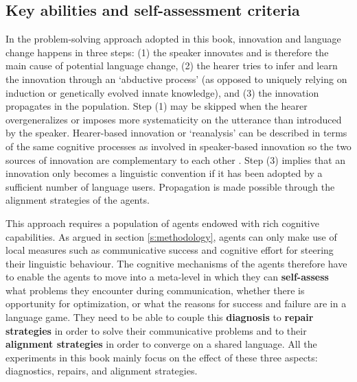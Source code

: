\subsection{Key abilities and self-assessment criteria}

In the problem-solving approach adopted in this book, innovation and language change happens in three steps: (1) the speaker innovates and is therefore the main cause of potential language change, (2) the hearer tries to infer and learn the innovation through an `abductive process' (as opposed to uniquely relying on induction or genetically evolved innate knowledge), and (3) the innovation propagates in the population. Step (1) may be skipped when the hearer overgeneralizes or imposes more systematicity on the utterance than introduced by the speaker. Hearer-based innovation or `reanalysis' can be described in terms of the same cognitive processes as involved in speaker-based innovation so the two sources of innovation are complementary to each other \citep{hoefler08reanalysis}. Step (3) implies that an innovation only becomes a linguistic convention if it has been adopted by a sufficient number of language users. Propagation is made possible through the alignment strategies of the agents.

This approach requires a population of agents endowed with rich cognitive capabilities. As argued in section \ref{s:methodology}, agents can only make use of local measures such as communicative success and cognitive effort for steering their linguistic behaviour. The cognitive mechanisms of the agents therefore have to enable the agents to move into a meta-level in which they can {\bfseries self-assess} what problems they encounter during communication, whether there is opportunity for optimization, or what the reasons for success and failure are in a language game. They need to be able to couple this {\bfseries diagnosis} to {\bfseries repair strategies} in order to solve their communicative problems and to their {\bfseries alignment strategies} in order to converge on a shared language. All the experiments in this book mainly focus on the effect of these three aspects: diagnostics, repairs, and alignment strategies.

